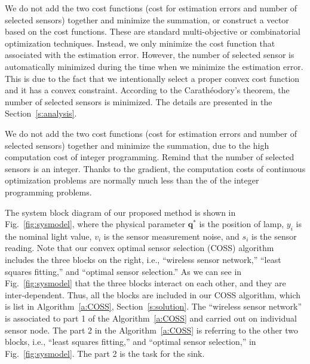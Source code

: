      We do not add the two cost functions (cost for estimation errors and number of selected sensors) together and minimize the summation, or construct a vector based on the cost functions. These are standard multi-objective or combinatorial optimization techniques. Instead, we only minimize the cost function that associated with the estimation error. However, the number of selected sensor is automatically minimized during the time when we minimize the estimation error. This is due to the fact that we intentionally select a proper convex cost function and it has a convex constraint. According to the Carath\'{e}odory's theorem, the number of selected sensors is minimized. The details are presented in the Section~\ref{s:analysis}.




  We do not add the two cost functions (cost for estimation errors and number of selected sensors) together and minimize the summation, due to the high computation cost of integer programming. Remind that the number of selected sensors is an integer.  Thanks to the gradient, the computation costs of continuous optimization problems are normally much less than the of the integer programming problems.


The system block diagram of our proposed method is shown in Fig.~\ref{fig:sysmodel}, where the physical parameter $\mathbf{q}^\ast$ is the position of lamp, $y_{i}$ is the nominal light value, $v_{i}$ is the sensor measurement noise, and $s_{i}$ is the sensor reading.
    Note that our convex optimal sensor selection (COSS) algorithm includes the three blocks on the right, i.e., ``wireless sensor network,'' ``least squares fitting,'' and ``optimal sensor selection.'' As we can see in Fig.~\ref{fig:sysmodel} that the three blocks interact on each other, and they are inter-dependent. Thus, all the blocks are included in our COSS algorithm, which is list in Algorithm~\ref{a:COSS}, Section~\ref{s:solution}. The ``wireless sensor network'' is associated to part 1 of the Algorithm~\ref{a:COSS} and carried out on individual sensor node. The part 2 in the Algorithm~\ref{a:COSS} is referring to the other two blocks, i.e., ``least squares fitting,'' and ``optimal sensor selection,'' in Fig.~\ref{fig:sysmodel}. The part 2 is the task for the sink.

